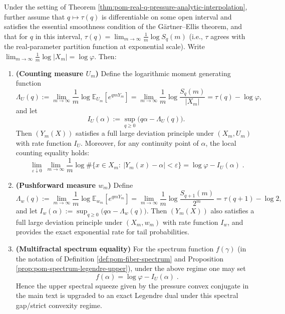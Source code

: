 \begin{theorem}\label{thm:pom-ldp-uniform-and-wm-exact-spectrum}
Under the setting of Theorem \ref{thm:pom-real-q-pressure-analytic-interpolation}, further assume that \(q\mapsto \tau(q)\) is differentiable on some open interval and satisfies the essential smoothness condition of the G\"artner--Ellis theorem, and that for \(q\) in this interval,
\(
\tau(q)=\lim_{m\to\infty}\frac{1}{m}\log S_q(m)
\)
(i.e., \(\tau\) agrees with the real-parameter partition function at exponential scale).
Write \(\lim_{m\to\infty}\frac{1}{m}\log|X_m|=\log\varphi\).
Then:
\begin{enumerate}
  \item \textbf{(Counting measure \(U_m\))}
  Define the logarithmic moment generating function
  \[
  \Lambda_U(q):=\lim_{m\to\infty}\frac{1}{m}\log \mathbb{E}_{U_m}[e^{qmY_m}]
  =\lim_{m\to\infty}\frac{1}{m}\log\frac{S_q(m)}{|X_m|}
  =\tau(q)-\log\varphi,
  \]
  and let
  \[
  I_U(\alpha):=\sup_{q\ge 0}\bigl(q\alpha-\Lambda_U(q)\bigr).
  \]
  Then \((Y_m(X))\) satisfies a full large deviation principle under \((X_m,U_m)\) with rate function \(I_U\).
  Moreover, for any continuity point of \(\alpha\), the local counting equality holds:
  \[
  \boxed{\;
  \lim_{\varepsilon\downarrow 0}\ \lim_{m\to\infty}\frac{1}{m}\log
  \#\{x\in X_m:\ |Y_m(x)-\alpha|<\varepsilon\}
  =\log\varphi-I_U(\alpha)\; }.
  \]
  \item \textbf{(Pushforward measure \(w_m\))}
  Define
  \[
  \Lambda_w(q):=\lim_{m\to\infty}\frac{1}{m}\log \mathbb{E}_{w_m}[e^{qmY_m}]
  =\lim_{m\to\infty}\frac{1}{m}\log\frac{S_{q+1}(m)}{2^m}
  =\tau(q+1)-\log 2,
  \]
  and let
  \(
  I_w(\alpha):=\sup_{q\ge 0}\bigl(q\alpha-\Lambda_w(q)\bigr)
  \).
  Then \((Y_m(X))\) also satisfies a full large deviation principle under \((X_m,w_m)\) with rate function \(I_w\), and provides the exact exponential rate for tail probabilities.
  \item \textbf{(Multifractal spectrum equality)}
  For the spectrum function \(f(\gamma)\) (in the notation of Definition \ref{def:pom-fiber-spectrum} and Proposition \ref{prop:pom-spectrum-legendre-upper}), under the above regime one may set
  \[
  \boxed{\;
  f(\alpha)=\log\varphi-I_U(\alpha)\; }.
  \]
  Hence the upper spectral squeeze given by the pressure convex conjugate in the main text is upgraded to an exact Legendre dual under this spectral gap/strict convexity regime.
\end{enumerate}
\end{theorem}

